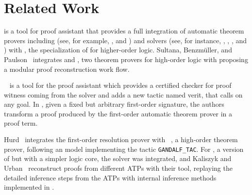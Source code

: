 \documentclass[main.tex]{subfiles}
\begin{document}

\section{Related Work}
\label{sec:related-work}

 is a tool for  proof assistant
\cite{paulson1994isabelle} that provides a full integration of
automatic theorem provers including \ATPs (see, for example,
\cite{meng2006automation}, \cite{blanchette2013extending} and
\cite{Fleury2014}) and \SMT solvers (see, for instance,
\cite{hurlin07practical}, \cite{bohme2010}, \cite{blanchette2013extending}, and \cite{Fleury2014}) with
 \cite{nipkow2002isabelle}, the specialization of
 for higher-order logic. Sultana, Benzm{\"{u}}ller,
and Paulson~\cite{Een2004} integrates  and
, two theorem provers for high-order logic with
 proposing a modular proof reconstruction work
flow.

~\cite{armand2011,Ekici2017} is a tool for the
 proof assistant \cite{coqteam} which provides a certified checker for proof witness coming from the \SMT solver 
\cite{bouton2009} and adds a new tactic named verit, that calls
 on any  goal. In \cite{bezem2002automated},
given a fixed but arbitrary first-order signature, the authors
transform a proof produced by the first-order automatic theorem
prover  \cite{deNivelle2003} in a  proof
term.

Hurd~\cite{Hurd1999} integrates the first-order resolution prover
 with ~\cite{norrish2007hol}, a high-order
theorem prover, following an  model implementing the
tactic \verb!GANDALF_TAC!. For , a version of
 but with a simpler logic core, the \SMT solver 
was integrated, and Kaliszyk and Urban~\cite{kaliszyk2013}
reconstruct proofs from different ATPs with their  tool,
replaying the detailed inference steps from the ATPs with internal
inference methods implemented in .



\end{document}
